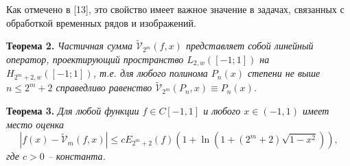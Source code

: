 \documentclass[12pt]{book}
\begin{document}
\noindent Как отмечено в [13],
это свойство имеет важное значение в задачах, связанных с обработкой временных рядов и изображений.

\noindent\textbf{Теорема 2. }\textit{
Частичная сумма $\tilde{\mathcal{V}}_{2^m}(f,x)$ представляет собой линейный оператор, проектирующий пространство $L_{2, w}([-1; 1])$ на $H_{2^m+2, w}([-1; 1])$, т.е. для любого полинома $P_n(x)$ степени не выше $n\le 2^{m}+2$ справедливо равенство $\tilde{\mathcal{V}}_{2^m}(P_n,x) \equiv P_n(x)$.
}




\noindent\textbf{Теорема 3. }\textit{
Для любой функции $f\in C[-1,1]$ и любого $x \in (-1, 1)$ имеет место оценка
\begin{equation*}
\label{sms1thrm3eq}
|f(x)-\tilde{\mathcal{V}}_m(f,x)|\le c E_{2^{m}+2}(f)(1+\ln(1+(2^{m}+2)\sqrt{1-x^2})),
\end{equation*}
где $c >0$ -- константа.
}
\end{document}
